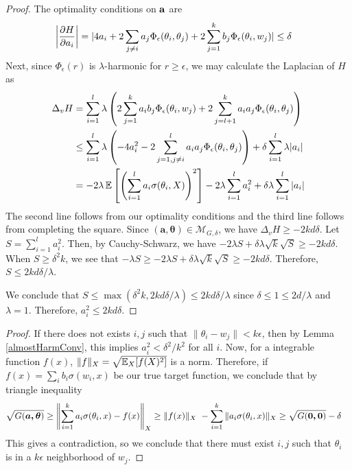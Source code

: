 \begin{proof}
The optimality conditions on ${\bf a}$ are 
\begin{align*}
   \left| \frac{\partial H}{\partial a_i} \right| & = \lvert 4a_i  + 2\sum_{j\neq i} a_j \Phi_\epsilon(\theta_i,\theta_j) + 2\sum_{j=1}^k b_j \Phi_\epsilon(\theta_i,w_j) \rvert \leq \delta
\end{align*}
%
Next, since $\Phi_\epsilon(r)$ is $\lambda$-harmonic for $r \geq \epsilon$, we may calculate the Laplacian of $H$ as
%
\begin{align*}
\Delta_v H & = \sum_{i=1}^l \lambda \left(2\sum_{j=1}^k a_ib_j
  \Phi_\epsilon(\theta_i, w_j) + 2\sum_{j=l+1}^k a_ia_j
  \Phi_\epsilon(\theta_i, \theta_j)\right) \\
& \leq \sum_{i=1}^l \lambda \left(-4 a_i^2 - 2
  \sum_{j = 1, j\neq i}^l  a_ia_j \Phi_\epsilon(\theta_i,\theta_j)\right)+ \delta \sum_{i=1}^l \lambda |a_i| \\
&= -2\lambda\operatorname*{\mathbb{E}}\left[\left( \sum_{i=1}^l a_i \sigma(\theta_i,X)\right)^2\right] -2\lambda \sum_{i=1}^l a_i^2+ \delta\lambda\sum_{i=1}^l  |a_i| 
\end{align*} 
%
The second line follows from our optimality conditions and the third line follows from completing the square. Since $\boldsymbol{(a,\theta)} \in \mathcal{M}_{G,\delta}$, we have $\Delta_v H \geq - 2kd\delta$. Let $S = \sum_{i=1}^l a_i^2$. Then, by Cauchy-Schwarz, we have $-2 \lambda S + \delta\lambda\sqrt{k} \sqrt{S} \geq -2kd\delta$. When $S \geq \delta^2 k$, we see that $-\lambda S \geq -2 \lambda S + \delta\lambda \sqrt{k}\sqrt{S} \geq -2kd\delta$. Therefore, $S \leq 2kd\delta/\lambda$.
 
We conclude that $S \leq \max(\delta^2k, 2kd\delta/\lambda) \leq 2kd\delta/\lambda$ since $\delta\leq 1 \leq 2d/\lambda$ and $\lambda = 1$. Therefore, $a_i^2 \leq 2kd\delta$.
\end{proof}

\almostharmres*

 \begin{proof}
 If there does not exists $i, j$ such that
   $\|\theta_i - w_j\| <k\epsilon$, then by Lemma \ref{almostHarmConv}, this implies $a_i^2 < \delta^2/k^2$ for all $i$. Now, for a integrable
   function $f(x)$, $\| f\|_X = \sqrt{\operatorname*{\mathbb{E}}_X[f(X)^2]}$ is a
   norm. Therefore, if $f(x) = \sum_i b_i \sigma(w_i,x)$ be our true
   target function, we conclude that by triangle inequality
\begin{align*}
\sqrt{G(\boldsymbol{a,\theta})}  & \geq \left\lVert \sum_{i=1}^k a_i \sigma(\theta_i,x) - f(x) \right\rVert_X \geq \|f(x)\|_X\ - \sum_{i=1}^k \|a_i\sigma(\theta_i,x) \|_X \geq
  \sqrt{G(\boldsymbol{0,0})} - \delta
\end{align*}
This gives a contradiction, so we conclude that there must exist $i, j$ such that $\theta_i$ is in a $k\epsilon$ neighborhood of $w_j$.
 \end{proof}
 
